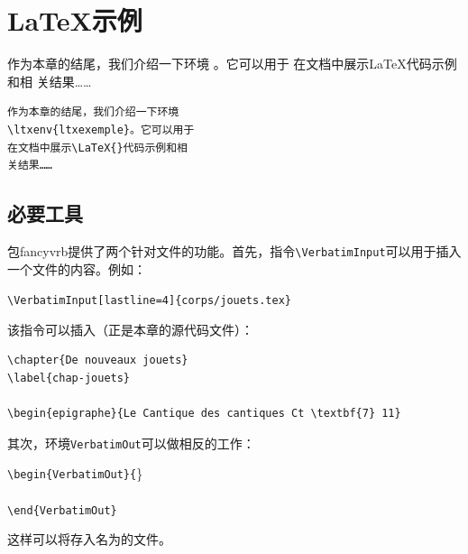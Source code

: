 \section{\LaTeX 示例}

\begin{codelist}[11.31]{
    作为本章的结尾，我们介绍一下环境
    。它可以用于
    在文档中展示\LaTeX 代码示例和相
    关结果……
}\begin{verbatim}
作为本章的结尾，我们介绍一下环境
\ltxenv{ltxexemple}。它可以用于
在文档中展示\LaTeX{}代码示例和相
关结果……
\end{verbatim}
\end{codelist}

\subsection{必要工具}

包\textsf{fancyvrb}提供了两个针对文件的功能。首先，指令\verb|\VerbatimInput|可以用于插入一个文件的内容。例如：

\begin{dmd}
\verb|\VerbatimInput[lastline=4]{corps/jouets.tex}|
\end{dmd}

该指令可以插入（正是本章的源代码文件）：

\begin{dmd}
\begin{verbatim}
\chapter{De nouveaux jouets}
\label{chap-jouets}

\begin{epigraphe}{Le Cantique des cantiques Ct \textbf{7} 11}
\end{verbatim}
\end{dmd}

其次，环境\verb|VerbatimOut|可以做相反的工作：

\begin{dmd}
\verb|\begin{VerbatimOut}{|\}\\
\verb|    |\\
\verb|\end{VerbatimOut}|
\end{dmd}

这样可以将存入名为的文件。

